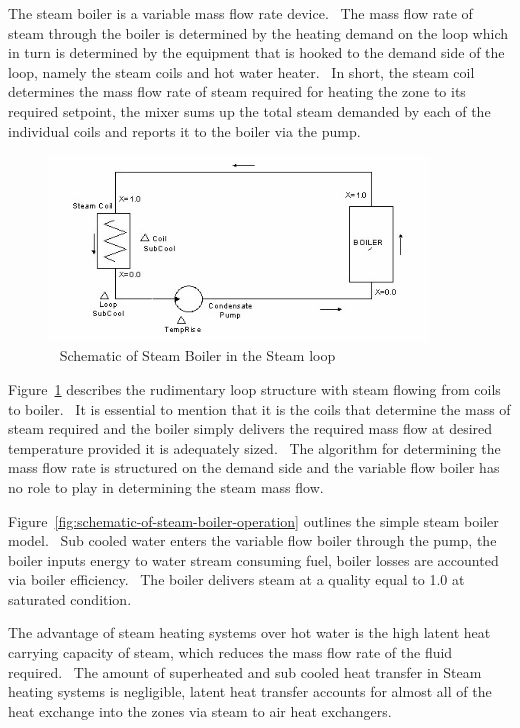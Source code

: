 The steam boiler is a variable mass flow rate device.~ The mass flow rate of steam through the boiler is determined by the heating demand on the loop which in turn is determined by the equipment that is hooked to the demand side of the loop, namely the steam coils and hot water heater.~ In short, the steam coil determines the mass flow rate of steam required for heating the zone to its required setpoint, the mixer sums up the total steam demanded by each of the individual coils and reports it to the boiler via the pump.

\begin{figure}[hbtp] %
\centering
\includegraphics[width=0.9\textwidth, height=0.9\textheight, keepaspectratio=true]{media/image2932.png}
\caption{  Schematic of Steam Boiler in the Steam loop \protect \label{fig:schematic-of-steam-boiler-in-the-steam-loop}}
\end{figure}

Figure~\ref{fig:schematic-of-steam-boiler-in-the-steam-loop} describes the rudimentary loop structure with steam flowing from coils to boiler.~ It is essential to mention that it is the coils that determine the mass of steam required and the boiler simply delivers the required mass flow at desired temperature provided it is adequately sized.~ The algorithm for determining the mass flow rate is structured on the demand side and the variable flow boiler has no role to play in determining the steam mass flow.

Figure~\ref{fig:schematic-of-steam-boiler-operation} outlines the simple steam boiler model.~ Sub cooled water enters the variable flow boiler through the pump, the boiler inputs energy to water stream consuming fuel, boiler losses are accounted via boiler efficiency.~ The boiler delivers steam at a quality equal to 1.0 at saturated condition.

The advantage of steam heating systems over hot water is the high latent heat carrying capacity of steam, which reduces the mass flow rate of the fluid required.~ The amount of superheated and sub cooled heat transfer in Steam heating systems is negligible, latent heat transfer accounts for almost all of the heat exchange into the zones via steam to air heat exchangers.

